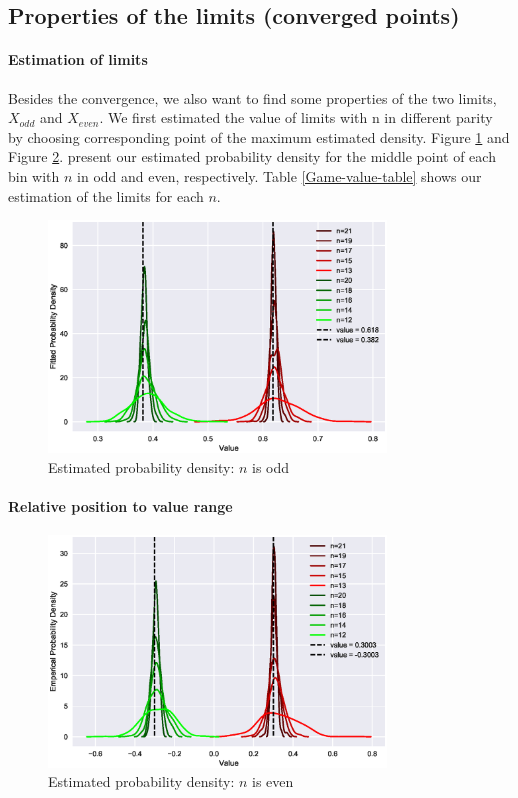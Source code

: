 \documentclass[a4paper,english]{article}
\begin{document}
\begin{spacing}{1.4}
\subsection{Properties of the limits (converged points)}
\paragraph{Estimation of limits}
Besides the convergence, we also want to find some properties of the two limits, $X_{odd}$ and $X_{even}$. We first estimated the value of limits with n in different parity by choosing corresponding point of the maximum estimated density. Figure \ref{pdf-odd} and Figure \ref{pdf-even}. present our estimated probability density for the middle point of each bin with $n$ in odd and even, respectively. Table \ref{Game-value-table} shows our estimation of the limits for each $n$.
\begin{figure}[htb!] \label{pdf-odd}
\centering
\includegraphics[width=0.8\textwidth]{figures/plot5.eps}
\caption{Estimated probability density:  $n$ is odd}
\end{figure}

\paragraph{Relative position to value range}
\begin{figure}[htb!] \label{pdf-even}
\centering
\includegraphics[width=0.8\textwidth]{figures/plot6.eps}
\caption{Estimated probability density:  $n$ is even}
\end{figure}


\end{spacing}
\end{document}
